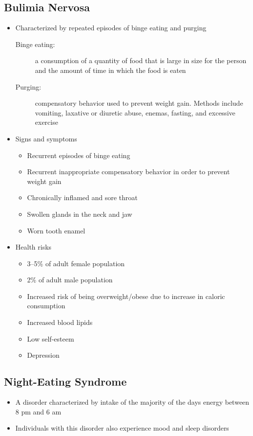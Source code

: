 \documentclass[title={Chapter 11}]{fdsn201notes}
\begin{document}
\subsection{Bulimia Nervosa}\label{subsec:bulimia-nervosa}
\begin{itemize}
	\item Characterized by repeated episodes of binge eating and purging
	\begin{description}
		\item[Binge eating:] a consumption of a quantity of food that is large in size for the person and the amount of time in which the food is eaten
		\item[Purging:] compensatory behavior used to prevent weight gain. Methods include vomiting, laxative or diuretic abuse, enemas, fasting, and excessive exercise
	\end{description}
	\item Signs and symptoms
	\begin{itemize}
		\item Recurrent episodes of binge eating
		\item Recurrent inappropriate compensatory behavior in order to prevent weight gain
		\item Chronically inflamed and sore throat
		\item Swollen glands in the neck and jaw
		\item Worn tooth enamel
	\end{itemize}
	\item Health risks
	\begin{itemize}
		\item 3--5\% of adult female population
		\item 2\% of adult male population
		\item Increased risk of being overweight/obese due to increase in caloric consumption
		\item Increased blood lipids
		\item Low self-esteem
		\item Depression
	\end{itemize}
\end{itemize}

\subsection{Night-Eating Syndrome}\label{subsec:night-eating-syndrome}
\begin{itemize}
	\item A disorder characterized by intake of the majority of the days energy between 8 pm and 6 am
	\item Individuals with this disorder also experience mood and sleep disorders
\end{itemize}
\end{document}
